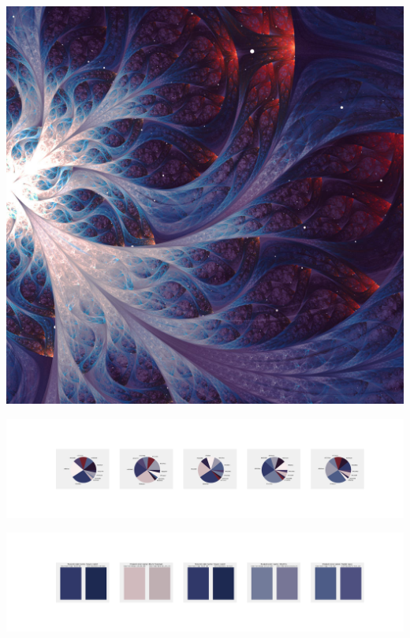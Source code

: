 \documentclass[11pt]{article}
\begin{document}
\begin{landscape}
    \begin{center}
    \includegraphics[width=\textwidth]{./nbimg/file (447).jpg}
    \end{center}

    \begin{center}
    \includegraphics[width=250mm]{./nbimg/pie-386.jpg}
    \end{center}

    \begin{center}
    \includegraphics[width=250mm]{./nbimg/peak-386.jpg}
    \end{center}
    


\end{landscape}
\end{document}
